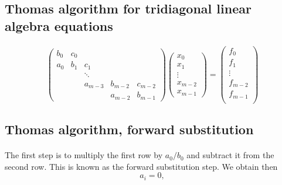\documentclass[%
oneside,                 %
final,                   %
10pt]{article}
\begin{document}
\noindent
\subsection*{Thomas algorithm for tridiagonal linear algebra equations}

\paragraph{}
\[
\left( \begin{array}{ccccc}
        b_0 & c_0 &        &         &         \\
	a_0 &  b_1 &  c_1    &         &         \\
	   &    & \ddots  &         &         \\
	      &	    & a_{m-3} & b_{m-2} & c_{m-2} \\
	         &    &         & a_{m-2} & b_{m-1}
   \end{array} \right)
\left( \begin{array}{c}
       x_0     \\
       x_1     \\
       \vdots  \\
       x_{m-2} \\
       x_{m-1}
   \end{array} \right)=\left( \begin{array}{c}
       f_0     \\
       f_1     \\
       \vdots  \\
       f_{m-2} \\
       f_{m-1} \\
   \end{array} \right)
\]



\subsection*{Thomas algorithm, forward substitution}

\paragraph{}
The first step is to multiply the first row by $a_0/b_0$ and subtract it from the second row.  This is known as the forward substitution step. We obtain then
\[
	a_i = 0,
\]
\end{document}
